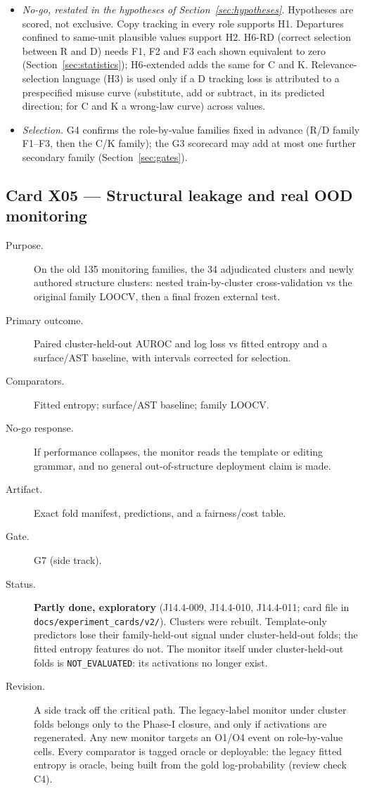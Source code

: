 \documentclass[10pt,a4paper]{article}
\newcommand{\NE}{\texttt{NOT\_EVALUATED}}
\begin{document}
\begin{description}
\begin{itemize}
\item \emph{No-go, restated in the hypotheses of Section~\ref{sec:hypotheses}.} Hypotheses are scored, not exclusive. Copy tracking in every role
supports H1. Departures confined to same-unit plausible values support H2. H6-RD (correct selection between R and D) needs F1, F2 and F3 each shown
equivalent to zero (Section~\ref{sec:statistics}); H6-extended adds the same for C and K. Relevance-selection language (H3) is
used only if a D tracking loss is attributed to a prespecified misuse curve (substitute, add or subtract, in its
predicted direction; for C and K a wrong-law curve) across values.
\item \emph{Selection.} G4 confirms the role-by-value families fixed in advance (R/D family F1--F3, then the C/K family); the G3
scorecard may add at most one further secondary family (Section~\ref{sec:gates}).
\end{itemize}
\end{description}

\subsection{Card X05 --- Structural leakage and real OOD monitoring}
\label{card:X05}
\begin{description}
\item[Purpose.] On the old 135 monitoring families, the 34 adjudicated clusters and newly authored structure
clusters: nested train-by-cluster cross-validation vs the original family LOOCV, then a final frozen external test.
\item[Primary outcome.] Paired cluster-held-out AUROC and log loss vs fitted entropy and a surface/AST baseline,
with intervals corrected for selection.
\item[Comparators.] Fitted entropy; surface/AST baseline; family LOOCV.
\item[No-go response.] If performance collapses, the monitor reads the template or editing grammar, and no
general out-of-structure deployment claim is made.
\item[Artifact.] Exact fold manifest, predictions, and a fairness/cost table.
\item[Gate.] G7 (side track).
\item[Status.] \textbf{Partly done, exploratory} (J14.4-009, J14.4-010, J14.4-011; card file in
\texttt{docs/experiment\_cards/v2/}). Clusters were rebuilt. Template-only predictors lose their family-held-out
signal under cluster-held-out folds; the fitted entropy features do not. The monitor itself under cluster-held-out
folds is \NE{}: its activations no longer exist.
\item[Revision.] A side track off the critical path. The legacy-label monitor under cluster folds belongs only to
the Phase-I closure, and only if activations are regenerated. Any new monitor targets an O1/O4 event on
role-by-value cells. Every comparator is tagged oracle or deployable: the legacy fitted entropy is oracle, being
built from the gold log-probability (review check C4).
\end{description}
\end{document}
